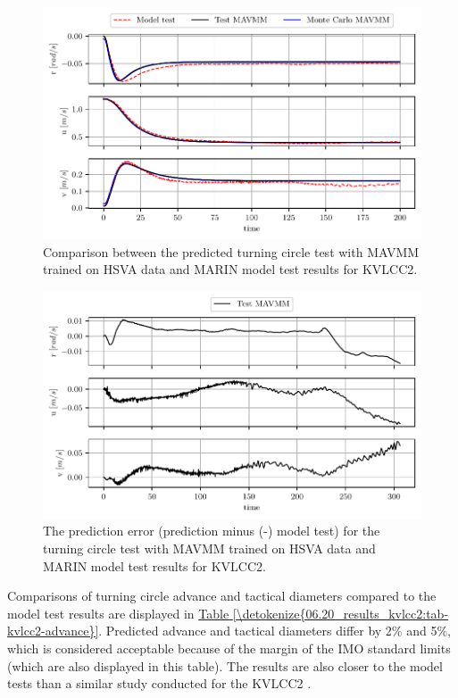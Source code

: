 \begin{figure}[h!]
\centering
\includegraphics[width=1.0\textwidth]{kappa/images/18.pdf}
\caption{Comparison between the predicted turning circle test with MAVMM trained on HSVA data and MARIN model test results for KVLCC2.}\label{\detokenize{06.20_results_kvlcc2:fig-kvlcc2-testing-sim}}\end{figure}
\begin{figure}[h!]
\centering
\includegraphics[width=1.0\textwidth]{kappa/images/19.pdf}
\caption{The prediction error (prediction minus (-) model test) for the turning circle test with MAVMM trained on HSVA data and MARIN model test results for KVLCC2.}\label{\detokenize{06.20_results_kvlcc2:fig-kvlcc2-testing-sim-error}}\end{figure} Comparisons of turning circle advance and tactical diameters compared to the model test results are displayed in \hyperref[\detokenize{06.20_results_kvlcc2:tab-kvlcc2-advance}]{Table \ref{\detokenize{06.20_results_kvlcc2:tab-kvlcc2-advance}}}. Predicted advance and tactical diameters differ by 2\% and 5\%, which is considered acceptable because of the margin of the IMO standard limits (which are also displayed in this table). The results are also closer to the model tests than a similar study conducted for the KVLCC2 \cite{he_nonparametric_2022}.
